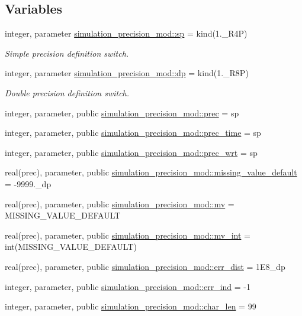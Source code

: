 \subsection*{Variables}
\begin{DoxyCompactItemize}
\item 
integer, parameter \mbox{\hyperlink{namespacesimulation__precision__mod_a15b1ab993f9b11430e9d9d3dc6c77614}{simulation\+\_\+precision\+\_\+mod\+::sp}} = kind(1.\+\_\+\+R4P)
\begin{DoxyCompactList}\small\item\em Simple precision definition switch. \end{DoxyCompactList}\item 
integer, parameter \mbox{\hyperlink{namespacesimulation__precision__mod_a4d49b0033a5e2bc6693c5b2dfb63a032}{simulation\+\_\+precision\+\_\+mod\+::dp}} = kind(1.\+\_\+\+R8P)
\begin{DoxyCompactList}\small\item\em Double precision definition switch. \end{DoxyCompactList}\item 
integer, parameter, public \mbox{\hyperlink{namespacesimulation__precision__mod_aaff1ddf996761a1e11e787d63e1612f6}{simulation\+\_\+precision\+\_\+mod\+::prec}} = sp
\item 
integer, parameter, public \mbox{\hyperlink{namespacesimulation__precision__mod_a3833ad1bc52c3738ac861591b7492737}{simulation\+\_\+precision\+\_\+mod\+::prec\+\_\+time}} = sp
\item 
integer, parameter, public \mbox{\hyperlink{namespacesimulation__precision__mod_ad515822198607dfee68a6ed8b246c7da}{simulation\+\_\+precision\+\_\+mod\+::prec\+\_\+wrt}} = sp
\item 
real(prec), parameter, public \mbox{\hyperlink{namespacesimulation__precision__mod_a1fb0f91226452bb43d4c61cae32a9a6d}{simulation\+\_\+precision\+\_\+mod\+::missing\+\_\+value\+\_\+default}} = -\/9999.\+\_\+dp
\item 
real(prec), parameter, public \mbox{\hyperlink{namespacesimulation__precision__mod_a39845d8a0d331a7b9225feb5fe19ba3b}{simulation\+\_\+precision\+\_\+mod\+::mv}} = M\+I\+S\+S\+I\+N\+G\+\_\+\+V\+A\+L\+U\+E\+\_\+\+D\+E\+F\+A\+U\+LT
\item 
real(prec), parameter, public \mbox{\hyperlink{namespacesimulation__precision__mod_abcad51274c804cb573d8f5720c5dfa05}{simulation\+\_\+precision\+\_\+mod\+::mv\+\_\+int}} = int(M\+I\+S\+S\+I\+N\+G\+\_\+\+V\+A\+L\+U\+E\+\_\+\+D\+E\+F\+A\+U\+LT)
\item 
real(prec), parameter, public \mbox{\hyperlink{namespacesimulation__precision__mod_ae3222dd2d51f6b7221be1ca1c70e3e6c}{simulation\+\_\+precision\+\_\+mod\+::err\+\_\+dist}} = 1\+E8\+\_\+dp
\item 
integer, parameter, public \mbox{\hyperlink{namespacesimulation__precision__mod_a82a4b689dc26018c961193b991c489d4}{simulation\+\_\+precision\+\_\+mod\+::err\+\_\+ind}} = -\/1
\item 
integer, parameter, public \mbox{\hyperlink{namespacesimulation__precision__mod_a8a3305091ff953708508525398aa7129}{simulation\+\_\+precision\+\_\+mod\+::char\+\_\+len}} = 99
\end{DoxyCompactItemize}
